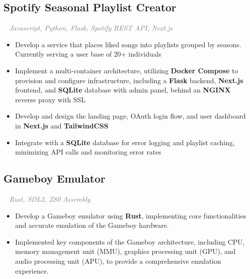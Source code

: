 \documentclass{article}
\newcommand{\resumesection}[3]{
    \subsection*{#1}
    \ 
    \normalsize
    \normalsize
    \hfill
    \textcolor{black}{#3}
    \normalsize
    \newline
    \small
    \textcolor{grey}{\emph{#2}}
}
\begin{document}
\resumesection{Spotify Seasonal Playlist Creator}{Javascript, Python, Flask, Spotify REST API, Next.js}{}
\begin{itemize}
	\item Develop a service that places liked songs into playlists grouped by seasons. Currently serving a user base of 20+ individuals
	\item Implement a multi-container architecture, utilizing \textbf{Docker Compose} to provision and configure infrastructure, including a \textbf{Flask} backend, \textbf{Next.js} frontend, and \textbf{SQLite} database with admin panel, behind an \textbf{NGINX} reverse proxy with SSL
	\item Develop and design the landing page, OAuth login flow, and user dashboard in \textbf{Next.js} and \textbf{TailwindCSS}
	\item Integrate with a \textbf{SQLite} database for error logging and playlist caching, minimizing API calls and monitoring error rates
\end{itemize}
\resumesection{Gameboy Emulator}{Rust, SDL2, Z80 Assembly}{}
\begin{itemize}
	\item Develop a Gameboy emulator using \textbf{Rust}, implementing core functionalities and accurate emulation of the Gameboy hardware.
	\item Implemented key components of the Gameboy architecture, including CPU, memory management unit (MMU), graphics processing unit (GPU), and audio processing unit (APU), to provide a comprehensive emulation experience.
\end{itemize}

\end{document}
